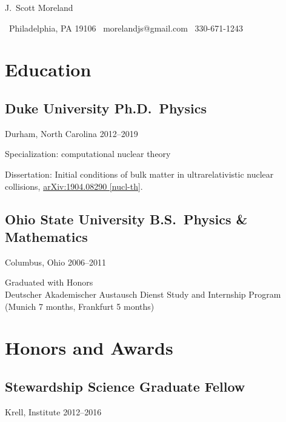 \documentclass[letterpaper,10pt]{article}
\begin{document}
\newcommand{\sep}{{\quad\textbar\quad}}

\begin{center}
  {\huge\raleway J.\ Scott Moreland}
\end{center}

\begin{center}
  \small
  \, Philadelphia, PA 19106 \sep
  \, morelandjs@gmail.com \sep
  \, 330-671-1243
\end{center}

\smallskip

\newcommand{\subheading}[3]{{\small #1 \hfill #2--#3}}

\begin{multicols}{2}

\section{Education}

\subsection{Duke University \hfill Ph.D.\ Physics}
\subheading{Durham, North Carolina}{2012}{2019}

Specialization: computational nuclear theory

\smallskip

Dissertation: Initial conditions of bulk matter in ultrarelativistic nuclear collisions,
\href{https://arxiv.org/abs/1904.08290}{\small arXiv:1904.08290 [nucl-th]}.

\subsection{Ohio State University \hfill B.S.\ Physics \& Mathematics}
\subheading{Columbus, Ohio}{2006}{2011}

Graduated with Honors\\
Deutscher Akademischer Austausch Dienst Study and Internship Program (Munich 7 months, Frankfurt 5 months)

\section{Honors and Awards}

\subsection{Stewardship Science Graduate Fellow}
\subheading{Krell, Institute}{2012}{2016}


\end{multicols}
\end{document}
